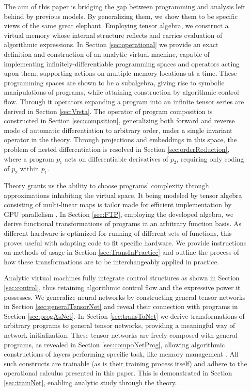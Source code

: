 \documentclass[smallcondensed]{svjour3}
\begin{document}
The aim of this paper is bridging the gap between programming and analysis left behind by previous models. By generalizing them, we show them to be specific views of the same great elephant. Employing tensor algebra, we construct a virtual memory whose internal structure reflects and carries evaluation of algorithmic expressions. In Section \ref{sec:operational} we provide an exact definition and construction of an analytic virtual machine, capable of implementing infinitely-differentiable programming spaces and operators acting upon them, supporting actions on multiple memory locations at a time. These programming spaces are shown to be a subalgebra, giving rise to symbolic manipulations of programs, while attaining construction by algorithmic control flow. Through it operators expanding a program into an infinite tensor series are derived in Section \ref{sec:Vrsta}. The operator of program composition is constructed in Section \ref{sec:compsition}, generalizing both forward \cite{PcAD} and reverse \cite{ReverseAD} mode of automatic differentiation to arbitrary order, under a single invariant operator in the theory. Through projections and embeddings in this space, the problem of nested differentiation is resolved in Section \ref{sec:orderReduction}, where a program $p_1$ acts on differentiable derivatives of $p_2$, requiring only coding of $p_2$ within $p_1$.

Theory grants us the ability to choose programs' complexity through approximations inhabiting the virtual space. It being modeled by tensor algebra consisting of multi-linear maps is tailor made for efficient implementation by GPU parallelism \cite{TensorGPU}. In Section \ref{sec:FTP}, employing the developed algebra, we derive functional transformations of programs in an arbitrary function basis. 
As different hardware is optimized for running of different sets of functions, this proves useful with adapting code to fit specific hardware.
We provide instructions on methods of usage in Section \ref{sec:TransInPractice} and outline the process of how these transformations are to be interchangeably applied in practice. 

Analytic virtual machines fully integrate control structures as shown in Section \ref{sec:control}, thus retaining algorithmic control flow and the expressive power it possesses. 
We generalize neural networks by constructing general tensor networks in Section \ref{sec:generalTensorNet} and reveal their connection with programs in Section \ref{sec:progAsNet}. In Section \ref{sec:transToNet} we derive transformations of arbitrary programs to general tensor networks, providing a meaningful way of network initialization. These tensor networks are freely composed with general programs, as revealed in Section \ref{sec:compoNetProg}, allowing algorithmic constructions of layers performing specific task, like memory management \cite{LSTM}\cite{netRam}. All such constructs are trainable (as is their training process itself) and adhere to the operational calculus presented in this paper. This is demonstrated in Section \ref{sec:trainNet}, enabling analytic study through the theory.
\end{document}
